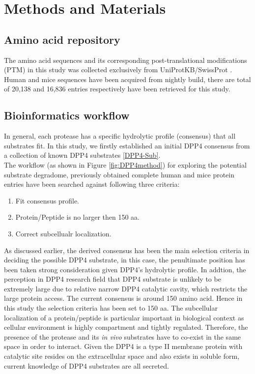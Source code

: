 \section{Methods and Materials}
\subsection{Amino acid repository}
The amino acid sequences and its corresponding post-translational modifications (PTM) in this study was collected exclusively from UniProtKB/SwissProt \cite{Magrane:2011fv}. Human and mice sequences have been acquired from nightly build, there are total of 20,138 and 16,836 entries respectively have been retrieved for this study. 
\\
\subsection{Bioinformatics workflow}
In general, each protease has a specific hydrolytic profile (consensus) that all substrates fit. In this study, we firstly established an initial DPP4 consensus from a collection of known DPP4 substrates \ref{DPP4-Sub}. 
\\
The workflow (as shown in Figure \ref{fig:DPP4method}) for exploring the potential substrate degradome, previously obtained complete human and mice protein entries have been searched against following three criteria:
\begin{enumerate}
\item Fit consensus profile.
\item Protein/Peptide is no larger then 150 aa. 
\item Correct subcellualr localization.
\end{enumerate}

As discussed earlier, the derived consensus has been the main selection criteria in deciding the possible DPP4 substrate, in this case, the penultimate position has been taken strong consideration given DPP4's hydrolytic profile. In addtion, the perception in DPP4 research field that DPP4 substrate is unlikely to be extremely large due to relative narrow DPP4 catalytic cavity, which restricts the large protein access. The current consensus is around 150 amino acid. Hence in this study the selection criteria has been set to 150 aa. The subcellular localization of a protein/peptide is particular important in biological context as cellular environment is highly compartment and tightly regulated. Therefore, the presence of the protease and its \textit{in vivo} substrates have to co-exist in the same space in order to interact. Given the DPP4 is a type II membrane protein with catalytic site resides on the extracellular space and also exists in soluble form, current knowledge of DPP4 substrates are all secreted. 
\\
